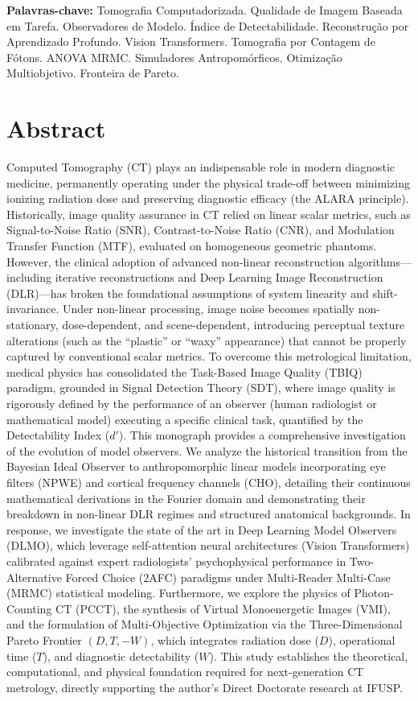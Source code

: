 \documentclass[
  12pt,
  a4paper,
  oneside
]{report}
\begin{document}
\vspace{0.8cm}
\noindent\textbf{Palavras-chave:} Tomografia Computadorizada. Qualidade de Imagem Baseada em Tarefa. Observadores de Modelo. Índice de Detectabilidade. Reconstrução por Aprendizado Profundo. Vision Transformers. Tomografia por Contagem de Fótons. ANOVA MRMC. Simuladores Antropomórficos. Otimização Multiobjetivo. Fronteira de Pareto.
\clearpage

\chapter*{Abstract}

Computed Tomography (CT) plays an indispensable role in modern diagnostic medicine, permanently operating under the physical trade-off between minimizing ionizing radiation dose and preserving diagnostic efficacy (the ALARA principle). Historically, image quality assurance in CT relied on linear scalar metrics, such as Signal-to-Noise Ratio (SNR), Contrast-to-Noise Ratio (CNR), and Modulation Transfer Function (MTF), evaluated on homogeneous geometric phantoms. However, the clinical adoption of advanced non-linear reconstruction algorithms---including iterative reconstructions and Deep Learning Image Reconstruction (DLR)---has broken the foundational assumptions of system linearity and shift-invariance. Under non-linear processing, image noise becomes spatially non-stationary, dose-dependent, and scene-dependent, introducing perceptual texture alterations (such as the ``plastic'' or ``waxy'' appearance) that cannot be properly captured by conventional scalar metrics. To overcome this metrological limitation, medical physics has consolidated the Task-Based Image Quality (TBIQ) paradigm, grounded in Signal Detection Theory (SDT), where image quality is rigorously defined by the performance of an observer (human radiologist or mathematical model) executing a specific clinical task, quantified by the Detectability Index ($d'$). This monograph provides a comprehensive investigation of the evolution of model observers. We analyze the historical transition from the Bayesian Ideal Observer to anthropomorphic linear models incorporating eye filters (NPWE) and cortical frequency channels (CHO), detailing their continuous mathematical derivations in the Fourier domain and demonstrating their breakdown in non-linear DLR regimes and structured anatomical backgrounds. In response, we investigate the state of the art in Deep Learning Model Observers (DLMO), which leverage self-attention neural architectures (Vision Transformers) calibrated against expert radiologists' psychophysical performance in Two-Alternative Forced Choice (2AFC) paradigms under Multi-Reader Multi-Case (MRMC) statistical modeling. Furthermore, we explore the physics of Photon-Counting CT (PCCT), the synthesis of Virtual Monoenergetic Images (VMI), and the formulation of Multi-Objective Optimization via the Three-Dimensional Pareto Frontier $(D, T, -W)$, which integrates radiation dose ($D$), operational time ($T$), and diagnostic detectability ($W$). This study establishes the theoretical, computational, and physical foundation required for next-generation CT metrology, directly supporting the author's Direct Doctorate research at IFUSP.
\end{document}

